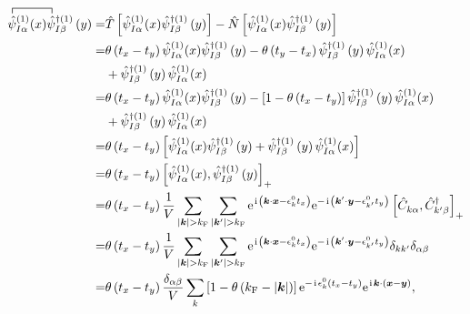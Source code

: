 \begin{align}
\contraction{}{\hat{\psi}}{_{I \alpha}^{(1)}(x)}{\hat{\psi}}
\hat{\psi}_{I \alpha}^{(1)}(x) \hat{\psi}_{I \beta}^{\dagger(1)}\left(y\right)
=&\hat{T}\left[\hat{\psi}_{I \alpha}^{(1)}(x) \hat{\psi}_{I \beta}^{\dagger(1)}\left(y\right)\right]-\hat{N}\left[\hat{\psi}_{I \alpha}^{(1)}(x) \hat{\psi}_{I \beta}^{\dagger(1)}\left(y\right)\right]\nonumber\\
=&\theta\left(t_x-t_y\right) \hat{\psi}_{I \alpha}^{(1)}(x) \hat{\psi}_{I \beta}^{\dagger(1)}\left(y\right)-\theta\left(t_y-t_x\right) \hat{\psi}_{I \beta}^{\dagger(1)}\left(y\right) \hat{\psi}_{I \alpha}^{(1)}(x)\nonumber\\
&+\hat{\psi}_{I \beta}^{\dagger(1)}\left(y\right) \hat{\psi}_{I \alpha}^{(1)}(x)\nonumber\\
=&\theta\left(t_x-t_y\right) \hat{\psi}_{I \alpha}^{(1)}(x) \hat{\psi}_{I \beta}^{\dagger(1)}\left(y\right)-\left[1-\theta\left(t_x-t_y\right)\right] \hat{\psi}_{I \beta}^{\dagger(1)}\left(y\right) \hat{\psi}_{I \alpha}^{(1)}(x)\nonumber\\
&+\hat{\psi}_{I \beta}^{\dagger(1)}\left(y\right) \hat{\psi}_{I \alpha}^{(1)}(x)\nonumber\\
=&\theta\left(t_x-t_y\right) \left[\hat{\psi}_{I \alpha}^{(1)}(x) \hat{\psi}_{I \beta}^{\dagger(1)}\left(y\right)+\hat{\psi}_{I \beta}^{\dagger(1)}\left(y\right) \hat{\psi}_{I \alpha}^{(1)}(x)\right]\nonumber\\
=&\theta\left(t_x-t_y\right)\left[\hat{\psi}_{I \alpha}^{(1)}(x), \hat{\psi}_{I \beta}^{\dagger(1)}\left(y\right)\right]_{+}\nonumber\\
=&\theta\left(t_x-t_y\right) \frac{1}{V} \sum_{|\vct{k}|>k_{\fun F}} \sum_{\left|\vct{k}^{\prime}\right|>k_{\fun F}}\e^{\ii\left(\vct{k} \cdot \vct{x}-\epsilon_{k}^{0} t_x\right)} \e^{-\ii\left(\vct{k}^{\prime} \cdot \vct{y}-\epsilon_{k^{\prime}}^{0} t_y\right)}\left[\hat{C}^{}_{k \alpha}, \hat{C}_{k^{\prime} \beta}^{\dagger}\right]_{+}\nonumber\\
=&\theta\left(t_x-t_y\right) \frac{1}{V} \sum_{|\vct{k}|>k_{\fun F}} \sum_{|\vct{k} '|>k_{\fun F}} \e^{\ii\left(\vct{k} \cdot \vct{x}-\epsilon_{k}^{0} t_x\right)} \e^{-\ii\left(\vct{k}^{\prime} \cdot \vct{y}-\epsilon_{k^{\prime}}^{0} t_y\right)} \delta_{k k^{\prime}} \delta_{\alpha \beta}\nonumber\\
=&\theta\left(t_x-t_y\right)\frac{\delta_{\alpha \beta}}{V} \sum_{k} \left[1-\theta\left(k_{\fun F}-|\vct{k}|\right)\right] \e^{-\ii\epsilon_{k}^{0}\left(t_x-t_y\right)} \e^{\ii\vct{k} \cdot\left(\vct{x}-\vct{y}\right)},
\end{align}
